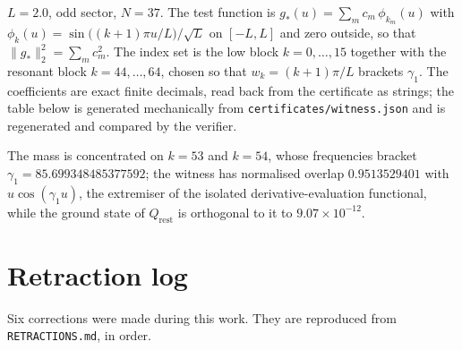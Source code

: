\documentclass[11pt,a4paper]{article}
\theoremstyle{definition}
\theoremstyle{remark}
\newcommand{\src}[1]{{\footnotesize\texttt{#1}}}
\newcommand{\Qrest}{Q_{\mathrm{rest}}}
\begin{document}
$L = 2.0$, odd sector, $N = 37$. The test function is
$g_*(u) = \sum_{m} c_m\,\phi_{k_m}(u)$ with
$\phi_k(u) = \sin\bigl((k+1)\pi u/L\bigr)\big/\sqrt{L}$ on $[-L,L]$ and zero outside, so
that $\|g_*\|_2^2 = \sum_m c_m^2$. The index set is the low block $k = 0,\ldots,15$
together with the resonant block $k = 44,\ldots,64$, chosen so that
$w_k = (k+1)\pi/L$ brackets $\gamma_1$. The coefficients are exact finite decimals, read
back from the certificate as strings; the table below is generated mechanically from
\src{certificates/witness.json} and is regenerated and compared by the verifier.



\noindent The mass is concentrated on $k=53$ and $k=54$, whose frequencies bracket
$\gamma_1 = 85.699348485377592$; the witness has normalised overlap $0.9513529401$ with
$u\cos(\gamma_1 u)$, the extremiser of the isolated derivative-evaluation functional,
while the ground state of $\Qrest$ is orthogonal to it to $9.07\times10^{-12}$.

\section{Retraction log}\label{app:retr}

Six corrections were made during this work. They are reproduced from
\src{RETRACTIONS.md}, in order.
\end{document}
